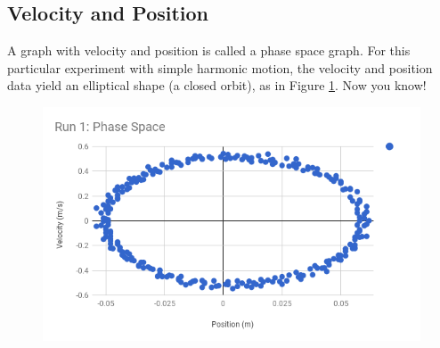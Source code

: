 \subsection{Velocity and Position}
A graph with velocity and position is called a phase space graph. For this particular experiment with simple harmonic motion, the velocity and position data yield an elliptical shape (a closed orbit), as in Figure \ref{figure.11.phase}. Now you know!
\begin{figure}
    \begin{center}
        \includegraphics[scale=0.77]{images/11-shm/phase.png}
    \end{center}
    \caption{}
    \label{figure.11.phase}
\end{figure}
